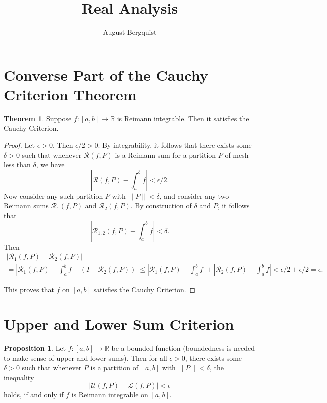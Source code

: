 \documentclass[12pt]{article}
\title{Real Analysis}
\author{August Bergquist}
\newcommand{\R}{\mathbb{R}}
\newcommand\norm[1]{\lVert#1\rVert} %
\theoremstyle{definition}
\newtheorem{theorem}{Theorem}
\newtheorem{proposition}{Proposition}
\begin{document}
    \maketitle

    \section{Converse Part of the Cauchy Criterion Theorem}

    \begin{theorem}
        Suppose $f:[a,b]\to \R$ is Reimann integrable. Then it satisfies the Cauchy Criterion.
    \end{theorem}

    \begin{proof}
        Let $\epsilon > 0$. Then $\epsilon/2 > 0$. By integrability, it follows that there exists some $ \delta > 0$ such that whenever $\mathcal{R}(f,P)$ is a Reimann sum for a partition $P$ of mesh less than $\delta$, we have 
        \[
        \left|\mathcal{R}(f,P) - \int_a^bf\right| < \epsilon/2.     
        \]
        Now consider any such partition $P$ with $\norm{P} < \delta$, and consider any two Reimann sums $\mathcal{R}_1(f,P)$ and $\mathcal{R}_2(f,P)$. By construction of $\delta$ and $P$, it follows that 
        \[
        \left|\mathcal{R}_{1,2}(f,P) - \int_a^bf\right| < \delta.    
        \]
        Then 
        \begin{equation}
            \begin{split}
            \left|\mathcal{R}_1(f,P)-\mathcal{R}_2(f,P)\right|  \\
            = \left|\mathcal{R}_1(f,P)- \int_a^bf + (I - \mathcal{R}_2(f,P))\right| 
            \le \left|\mathcal{R}_1(f,P)-\int_a^bf\right| + \left|\mathcal{R}_2(f,P)-\int_a^bf\right| < \epsilon/2 + \epsilon/2 = \epsilon.
            \end{split}
        \end{equation}

        This proves that $f$ on $[a,b]$ satisfies the Cauchy Criterion.
        
    \end{proof}

    \section{Upper and Lower Sum Criterion}

    \begin{proposition}
        Let $f:[a,b]\to \R $ be a bounded function (boundedness is needed to make sense of upper and lower sums). Then for all $\epsilon > 0$, there exists some $\delta > 0$ such that whenever $ P $ is a partition of $[a,b]$ with $\norm{P} < \delta$, the inequality
        \[
        \left| \mathcal{U}(f,P) - \mathcal{L}(f,P) \right| < \epsilon    
        \] 
        holds, if and only if $f$ is Reimann integrable on $[a,b]$.
    \end{proposition}
\end{document}
